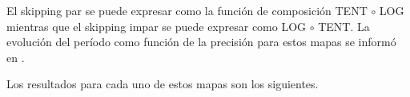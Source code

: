 El skipping par se puede expresar como la función de composición TENT $\circ$ LOG mientras que el skipping impar se puede expresar como LOG $\circ$ TENT.
La evolución del período como función de la precisión para estos mapas se informó en \cite{Nagaraj2008}.

Los resultados para cada uno de estos mapas son los siguientes.